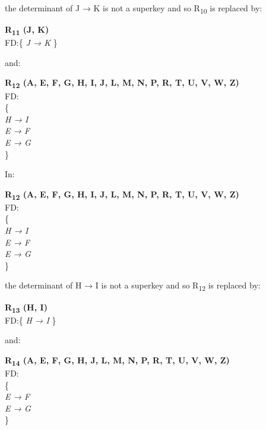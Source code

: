 the determinant of J → K is not a superkey and so R\textsubscript{10} is replaced by:\\

\begin{adjustwidth}{2cm}{}
\textbf{R\textsubscript{11} (J, K)}\\
FD:\{
\textit{ 
J → K 
}
\} \\
\end{adjustwidth} 

and:\\

\begin{adjustwidth}{2cm}{}
\textbf{R\textsubscript{12} (A, E, F, G, H, I, J, L, M, N, P, R, T, U, V, W, Z)}\\
FD:\\
\{\\
\textit{ 
H → I\\
E → F\\
E → G\\
}
\} \\
\end{adjustwidth} 


In:\\

\begin{adjustwidth}{2cm}{}
\textbf{R\textsubscript{12} (A, E, F, G, H, I, J, L, M, N, P, R, T, U, V, W, Z)}\\
FD:\\
\{\\
\textit{ 
H → I\\
E → F\\
E → G\\
}
\} \\
\end{adjustwidth} 

the determinant of H → I is not a superkey and so R\textsubscript{12} is replaced by:

\begin{adjustwidth}{2cm}{}
\textbf{R\textsubscript{13} (H, I)}\\
FD:\{
\textit{ 
H → I 
}
\} \\
\end{adjustwidth} 

and:\\

\begin{adjustwidth}{2cm}{}
\textbf{R\textsubscript{14} (A, E, F, G, H, J, L, M, N, P, R, T, U, V, W, Z)}\\
FD:\\
\{\\
\textit{ 
E → F\\
E → G\\
}
\} \\
\end{adjustwidth} 

